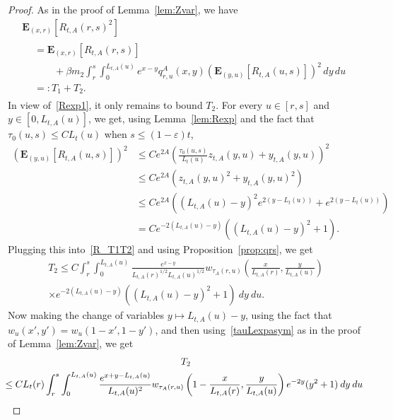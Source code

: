 \documentclass[10pt]{amsart}
\theoremstyle{definition}\newtheorem{defi}[theo]{Definition}\newtheorem{rema}[theo]{Remark}\newtheorem{exam}[theo]{Example}\newtheorem{exem}[theo]{Example}\newtheorem{nota}[theo]{Notation}
\newcommand*\eps{\varepsilon}
\newcommand*\E{\mathbf{E}}
\newcommand{\1} {\mathds{1}}
\begin{document}
\begin{proof}
As in the proof of Lemma~\ref{lem:Zvar}, we have
\begin{multline}\label{R_T1T2}
\E_{(x,r)}\left[R_{t,A}(r,s)^2\right]\\
\begin{aligned}
&= \E_{(x,r)}\left[R_{t,A}(r,s)\right] \\
&\qquad + \beta m_2 \int_r^s \int_0^{L_{t,A}(u)} e^{x-y}q^A_{r,u}(x,y)\left(\E_{(y,u)}\left[R_{t,A}(u,s)\right]\right)^2\,dy\,du\\
&=: T_1 + T_2.
\end{aligned}
\end{multline}
In view of~\eqref{Rexp1}, it only remains to bound $T_2$. For every $u\in[r,s]$ and $y\in [0,L_{t,A}(u)]$, we get, using Lemma~\ref{lem:Rexp} and the fact that $\tau_0(u,s) \leq C L_t(u)$ when $s \leq (1 - \eps)t$,
\begin{align*}
\left(\E_{(y,u)}\left[R_{t,A}(u,s)\right]\right)^2 &\leq C e^{2A}\left(\frac{\tau_0(u,s)}{L_t(u)} z_{t,A}(y,u)+y_{t,A}(y,u)\right)^2 \\
&\leq C e^{2A} \left(z_{t,A}(y,u)^2+y_{t,A}(y,u)^2 \right) \\
&\leq C e^{2A} \left(\left(L_{t,A}(u) - y\right)^2 e^{2\left(y - L_t(u)\right)} + e^{2\left(y - L_t(u)\right)} \right) \\
&= C e^{-2\left(L_{t,A}(u) - y\right)} \left(\left(L_{t,A}(u) - y\right)^2 + 1 \right).
\end{align*}
Plugging this into~\eqref{R_T1T2} and using Proposition~\ref{prop:qrs}, we get
\begin{multline*}
T_2 \leq C \int_r^s \int_0^{L_{t,A}(u)} \frac{e^{x-y}}{L_{t,A}(r)^{1/2} L_{t,A}(u)^{1/2}} w_{\tau_A(r,u)}\left(\frac{x}{L_{t,A}(r)}, \frac{y}{L_{t,A}(u)} \right) \\
\times e^{-2\left(L_{t,A}(u) - y\right)} \left(\left(L_{t,A}(u) - y\right)^2 + 1 \right) \: dy \: du.
\end{multline*}
Now making the change of variables $y \mapsto L_{t,A}(u) - y$, using the fact that $w_u(x',y') = w_u(1 - x', 1 - y')$, and then using~\eqref{tauLexpasym} as in the proof of Lemma~\ref{lem:Zvar}, we get
\begin{multline*}
T_2\\
\mkern-15mu\begin{aligned}
&\leq C L_t(r) \int_r^s \int_0^{L_{t,A}(u)} \frac{e^{x + y - L_{t,A}(u)}}{L_{t,A}(u)^2} w_{\tau_A(r,u)}\left(1 - \frac{x}{L_{t,A}(r)}, \frac{y}{L_{t,A}(u)} \right) e^{-2y}(y^2 + 1) \: dy \: du \\

\end{aligned}
\end{multline*}
\end{proof}
\end{document}

